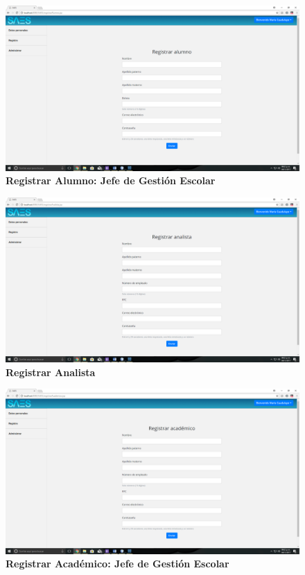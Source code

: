 \begin{figure}[H]
  \centering
    \includegraphics[scale=0.2]{project/images/19.png}
  \caption{\textbf{Registrar Alumno: Jefe de Gestión Escolar}}
\end{figure}
\begin{figure}[H]
  \centering
    \includegraphics[scale=0.2]{project/images/17.png}
  \caption{\textbf{Registrar Analista}}
\end{figure}
\begin{figure}[H]
  \centering
    \includegraphics[scale=0.2]{project/images/16.png}
  \caption{\textbf{Registrar Académico: Jefe de Gestión Escolar}}
\end{figure}
